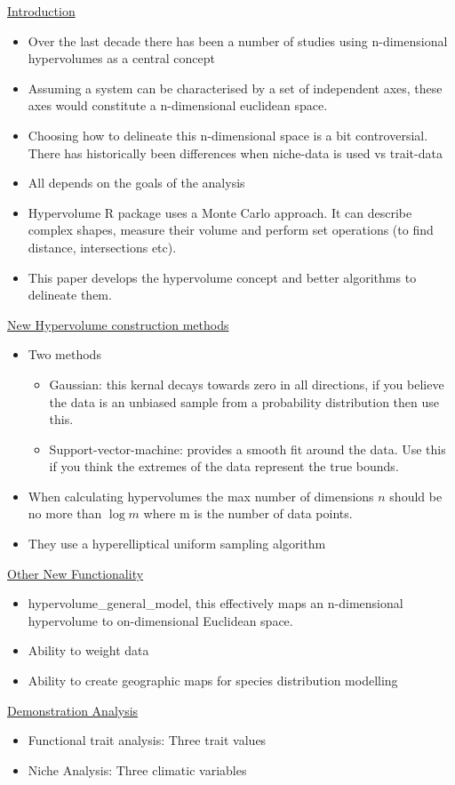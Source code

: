 \documentclass[11pt]{article}
\begin{document}
	\underline{Introduction}
	\begin{itemize}
		\item Over the last decade there has been a number of studies using n-dimensional hypervolumes as a central concept
		\item Assuming a system can be characterised by a set of independent axes, these axes would constitute a n-dimensional euclidean space.
		\item Choosing how to delineate this n-dimensional space is a bit controversial. There has historically been differences when niche-data is used vs trait-data
		\item All depends on the  goals of the analysis
		\item Hypervolume R package uses a Monte Carlo approach. It can describe complex shapes, measure their volume and perform set operations	(to find distance, intersections etc).
		\item This paper develops the hypervolume concept and better algorithms to delineate them.		
	\end{itemize}

	\underline{New Hypervolume construction methods}
	\begin{itemize}
		\item Two methods  
		\begin{itemize}
			\item Gaussian: this kernal decays towards zero in all directions, if you believe the data is an unbiased sample from a probability distribution then use this.
			\item Support-vector-machine: provides a smooth fit around the data. Use this if you think the extremes of the data represent the true bounds.
		\end{itemize}
		\item When calculating hypervolumes the max number of dimensions $n$ should be no more than $\log{m}$ where m is the number of data points.
		\item They use a hyperelliptical uniform sampling algorithm 
	\end{itemize}

	\underline{Other New Functionality}
	\begin{itemize}
		\item hypervolume\_general\_model, this effectively maps an n-dimensional hypervolume to on-dimensional Euclidean space.
		\item Ability to weight data
		\item Ability to create geographic maps for species distribution modelling
	\end{itemize}

	\underline{Demonstration Analysis}
	\begin{itemize}
		\item Functional trait analysis: Three trait values
		\item Niche Analysis: Three climatic variables
	\end{itemize}
	
	
	
\end{document}
